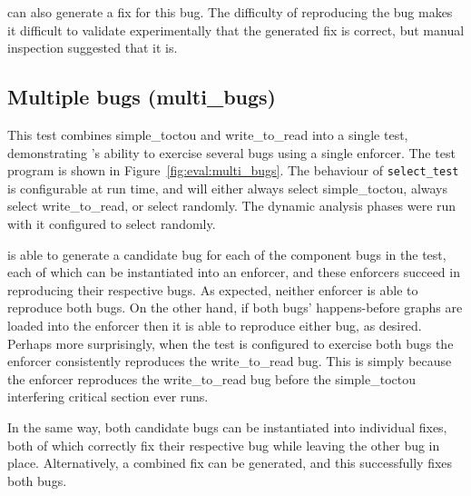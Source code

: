 {\Technique} can also generate a fix for this bug.  The difficulty of
reproducing the bug makes it difficult to validate experimentally that
the generated fix is correct, but manual inspection suggested that it
is.

\subsection{Multiple bugs (multi\_bugs)}

This test combines simple\_toctou and write\_to\_read into a single
test, demonstrating {\technique}'s ability to exercise several bugs
using a single enforcer.  The test program is shown in
Figure~\ref{fig:eval:multi_bugs}.  The behaviour of
\texttt{select\_test} is configurable at run time, and will either
always select simple\_toctou, always select write\_to\_read, or select
randomly.  The dynamic analysis phases were run with it configured to
select randomly.

{\Implementation} is able to generate a candidate bug for each of the
component bugs in the test, each of which can be instantiated into an
enforcer, and these enforcers succeed in reproducing their respective
bugs.  As expected, neither enforcer is able to reproduce both bugs.
On the other hand, if both bugs' happens-before graphs are loaded into
the enforcer then it is able to reproduce either bug, as desired.
Perhaps more surprisingly, when the test is configured to exercise
both bugs the enforcer consistently reproduces the write\_to\_read
bug.  This is simply because the enforcer reproduces the
write\_to\_read bug before the simple\_toctou interfering critical
section ever runs.

In the same way, both candidate bugs can be instantiated into
individual fixes, both of which correctly fix their respective bug
while leaving the other bug in place.  Alternatively, a combined fix
can be generated, and this successfully fixes both bugs.

